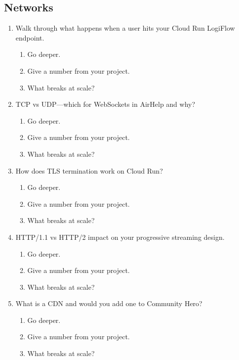 \documentclass[9pt,a4paper]{article}
\begin{document}
\subsection{Networks}
\begin{enumerate}[label=\textbf{Q\arabic*:}, leftmargin=*]
  \item Walk through what happens when a user hits your Cloud Run LogiFlow endpoint.
  \begin{enumerate}[label=\textit{FU\arabic*:}, leftmargin=2em]
    \item Go deeper.
    \item Give a number from your project.
    \item What breaks at scale?
  \end{enumerate}
  \item TCP vs UDP---which for WebSockets in AirHelp and why?
  \begin{enumerate}[label=\textit{FU\arabic*:}, leftmargin=2em]
    \item Go deeper.
    \item Give a number from your project.
    \item What breaks at scale?
  \end{enumerate}
  \item How does TLS termination work on Cloud Run?
  \begin{enumerate}[label=\textit{FU\arabic*:}, leftmargin=2em]
    \item Go deeper.
    \item Give a number from your project.
    \item What breaks at scale?
  \end{enumerate}
  \item HTTP/1.1 vs HTTP/2 impact on your progressive streaming design.
  \begin{enumerate}[label=\textit{FU\arabic*:}, leftmargin=2em]
    \item Go deeper.
    \item Give a number from your project.
    \item What breaks at scale?
  \end{enumerate}
  \item What is a CDN and would you add one to Community Hero?
  \begin{enumerate}[label=\textit{FU\arabic*:}, leftmargin=2em]
    \item Go deeper.
    \item Give a number from your project.
    \item What breaks at scale?
  \end{enumerate}
\end{enumerate}
\end{document}
